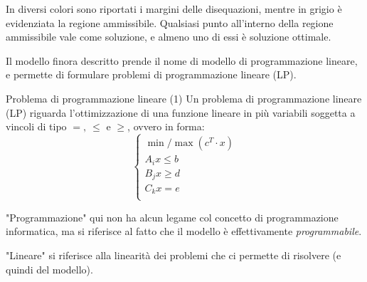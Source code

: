 \documentclass[a4paper,11pt]{article}
\begin{document}
In diversi colori sono riportati i margini delle disequazioni, mentre in grigio è evidenziata la regione ammissibile.
Qualsiasi punto all'interno della regione ammissibile vale come soluzione, e almeno uno di essi è soluzione ottimale.

\par\smallskip

Il modello finora descritto prende il nome di modello di programmazione lineare, e permette di formulare problemi di programmazione lineare (LP).

\begin{definition}{Problema di programmazione lineare (1)}
Un problema di programmazione lineare (LP) riguarda l'ottimizzazione di una funzione lineare in più variabili
soggetta a vincoli di tipo $ =, \ \leq $ e $ \geq $, ovvero in forma:
\[
	\begin{cases}
			\min / \max(c^T \cdot x) \\
			A_i x \leq b \\
			B_j x \geq d \\
			C_k x = e \\
	\end{cases}
\]
\end{definition}

"Programmazione" qui non ha alcun legame col concetto di programmazione informatica, ma si riferisce al fatto che il modello è effettivamente \textit{programmabile}.

"Lineare" si riferisce alla linearità dei problemi che ci permette di risolvere (e quindi del modello).
\end{document}
